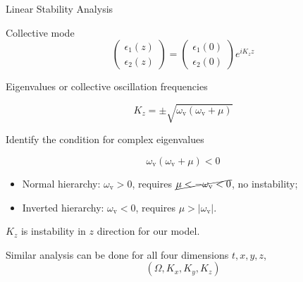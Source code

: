 \begin{frame}{Linear Stability Analysis}


Collective mode
\begin{equation*}
   \begin{pmatrix}
      \epsilon_1(z)\\
      \epsilon_2(z)
   \end{pmatrix} = \begin{pmatrix}
      \epsilon_1(0)\\
      \epsilon_2(0)
   \end{pmatrix} e^{i K_z z}
\end{equation*}


Eigenvalues or collective oscillation frequencies

\begin{equation*}
   K_z = \pm \sqrt{ \omega_{\mathrm v} ( \omega_{\mathrm v}+ \mu ) }
\end{equation*}

Identify the condition for complex eigenvalues

\begin{equation*}
   \omega_{\mathrm v} ( \omega_{\mathrm v}+ \mu ) < 0
\end{equation*}

\pause

\begin{itemize}
   \item Normal hierarchy: $\omega_{\mathrm v}>0$, requires $\cancel{ \mu  < -\omega_{\mathrm v} <0}$, no instability;
   \item Inverted hierarchy: $\omega_{\mathrm v}<0$, requires $\mu >\lvert \omega_{\mathrm v}\rvert$.
\end{itemize}

\pause

\begin{tcolorbox}
    \center
    $K_z$ is instability in $z$ direction for our model.
\end{tcolorbox}

\pause

\begin{tcolorbox}
    \centering
    Similar analysis can be done for all four dimensions $t, x, y, z$,
    \begin{equation*}
        \left( \Omega, K_x, K_y, K_z \right)
    \end{equation*}

 \end{tcolorbox}
\end{frame}



